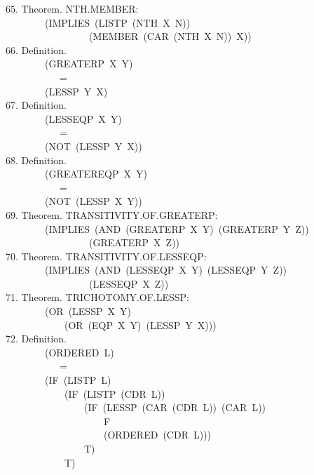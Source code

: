 \documentclass[10pt]{book}
\newenvironment{pubasis}{\begin{flushleft}}{\end{flushleft}}
\begin{document}
\begin{pubasis}
65.     Theorem.  NTH.MEMBER:\\
~~~~~~~~(IMPLIES~(LISTP~(NTH~X~N))\\
~~~~~~~~~~~~~~~~~(MEMBER~(CAR~(NTH~X~N))~X))\\

66.     Definition.\\
~~~~~~~~(GREATERP~X~Y)\\
~~~~~~~~~~~=\\
~~~~~~~~(LESSP~Y~X)\\

67.     Definition.\\
~~~~~~~~(LESSEQP~X~Y)\\
~~~~~~~~~~~=\\
~~~~~~~~(NOT~(LESSP~Y~X))\\

68.     Definition.\\
~~~~~~~~(GREATEREQP~X~Y)\\
~~~~~~~~~~~=\\
~~~~~~~~(NOT~(LESSP~X~Y))\\

69.     Theorem.  TRANSITIVITY.OF.GREATERP:\\
~~~~~~~~(IMPLIES~(AND~(GREATERP~X~Y)~(GREATERP~Y~Z))\\
~~~~~~~~~~~~~~~~~(GREATERP~X~Z))\\

70.     Theorem.  TRANSITIVITY.OF.LESSEQP:\\
~~~~~~~~(IMPLIES~(AND~(LESSEQP~X~Y)~(LESSEQP~Y~Z))\\
~~~~~~~~~~~~~~~~~(LESSEQP~X~Z))\\

71.     Theorem.  TRICHOTOMY.OF.LESSP:\\
~~~~~~~~(OR~(LESSP~X~Y)\\
~~~~~~~~~~~~(OR~(EQP~X~Y)~(LESSP~Y~X)))\\

72.     Definition.\\
~~~~~~~~(ORDERED~L)\\
~~~~~~~~~~~=\\
~~~~~~~~(IF~(LISTP~L)\\
~~~~~~~~~~~~(IF~(LISTP~(CDR~L))\\
~~~~~~~~~~~~~~~~(IF~(LESSP~(CAR~(CDR~L))~(CAR~L))\\
~~~~~~~~~~~~~~~~~~~~F\\
~~~~~~~~~~~~~~~~~~~~(ORDERED~(CDR~L)))\\
~~~~~~~~~~~~~~~~T)\\
~~~~~~~~~~~~T)\\


\end{pubasis}
\end{document}
